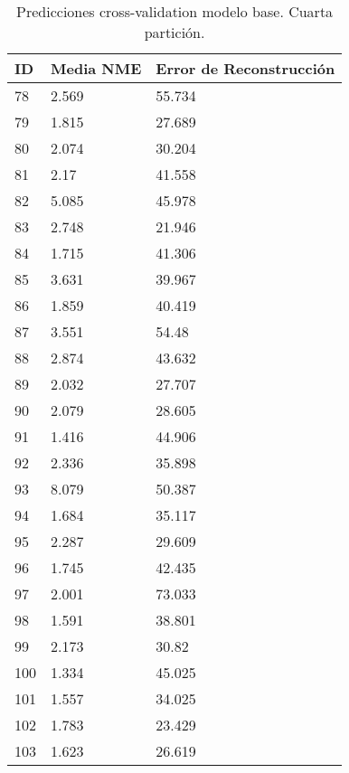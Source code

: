 \begin{table}[!ht]
    \centering
    \caption{Predicciones cross-validation modelo base. Cuarta partición.}
    \begin{tabular}{|l|l|l|}
    \hline
        \cellcolor{gray!25}\textbf{ID} & \cellcolor{gray!25}\textbf{Media NME} & \cellcolor{gray!25}\textbf{Error de Reconstrucción} \\ \hline
        78 & 2.569 & 55.734 \\ \hline
        79 & 1.815 & 27.689 \\ \hline
        80 & 2.074 & 30.204 \\ \hline
        81 & 2.17 & 41.558 \\ \hline
        82 & 5.085 & 45.978 \\ \hline
        83 & 2.748 & 21.946 \\ \hline
        84 & 1.715 & 41.306 \\ \hline
        85 & 3.631 & 39.967 \\ \hline
        86 & 1.859 & 40.419 \\ \hline
        87 & 3.551 & 54.48 \\ \hline
        88 & 2.874 & 43.632 \\ \hline
        89 & 2.032 & 27.707 \\ \hline
        90 & 2.079 & 28.605 \\ \hline
        91 & 1.416 & 44.906 \\ \hline
        92 & 2.336 & 35.898 \\ \hline
        93 & 8.079 & 50.387 \\ \hline
        94 & 1.684 & 35.117 \\ \hline
        95 & 2.287 & 29.609 \\ \hline
        96 & 1.745 & 42.435 \\ \hline
        97 & 2.001 & 73.033 \\ \hline
        98 & 1.591 & 38.801 \\ \hline
        99 & 2.173 & 30.82 \\ \hline
        100 & 1.334 & 45.025 \\ \hline
        101 & 1.557 & 34.025 \\ \hline
        102 & 1.783 & 23.429 \\ \hline
        103 & 1.623 & 26.619 \\ \hline
    \end{tabular}
\end{table}


